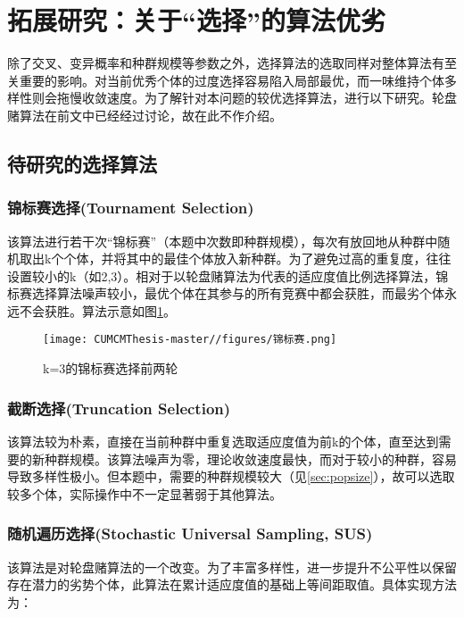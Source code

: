 \documentclass[withoutpreface,bwprint]{cumcmthesis} %
\begin{document}
\section{拓展研究：关于“选择”的算法优劣}
除了交叉、变异概率和种群规模等参数之外，选择算法的选取同样对整体算法有至关重要的影响。对当前优秀个体的过度选择容易陷入局部最优，而一味维持个体多样性则会拖慢收敛速度。为了解针对本问题的较优选择算法，进行以下研究。轮盘赌算法在前文中已经经过讨论，故在此不作介绍。

\subsection{待研究的选择算法}

\subsubsection{锦标赛选择(Tournament Selection)}

该算法进行若干次“锦标赛”（本题中次数即种群规模），每次有放回地从种群中随机取出k个个体，并将其中的最佳个体放入新种群。为了避免过高的重复度，往往设置较小的k（如2,3）。相对于以轮盘赌算法为代表的适应度值比例选择算法，锦标赛选择算法噪声较小，最优个体在其参与的所有竞赛中都会获胜，而最劣个体永远不会获胜。算法示意如图\ref{fig:tnmt}。

\begin{figure}[htbp]
    \centering
    \texttt{[image: CUMCMThesis-master//figures/锦标赛.png]}
    \caption{k=3的锦标赛选择前两轮}
    \label{fig:tnmt}
\end{figure}

\subsubsection{截断选择(Truncation Selection)}

该算法较为朴素，直接在当前种群中重复选取适应度值为前k的个体，直至达到需要的新种群规模。该算法噪声为零，理论收敛速度最快，而对于较小的种群，容易导致多样性极小。但本题中，需要的种群规模较大（见\ref{sec:popsize}），故可以选取较多个体，实际操作中不一定显著弱于其他算法。

\subsubsection{随机遍历选择(Stochastic Universal Sampling, SUS)}

该算法是对轮盘赌算法的一个改变。为了丰富多样性，进一步提升不公平性以保留存在潜力的劣势个体，此算法在累计适应度值的基础上等间距取值。具体实现方法为：
\end{document}
